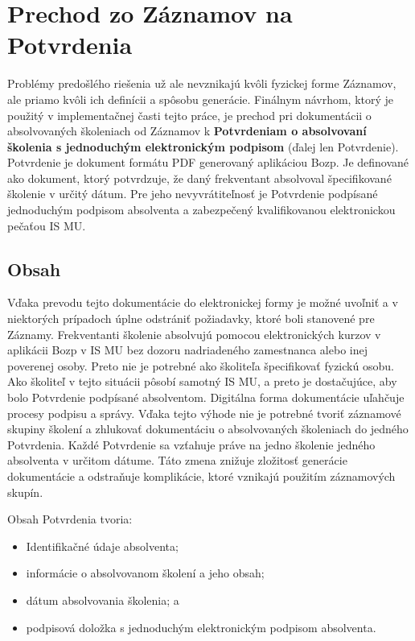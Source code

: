 \documentclass[
  digital,     %
  oneside,     %
  nosansbold,  %
  nocolorbold, %
  lof,         %
  nolot,         %
]{fithesis4}
\begin{document}
\section{Prechod zo Záznamov na Potvrdenia}
Problémy predošlého riešenia už ale nevznikajú kvôli fyzickej forme Záznamov, ale priamo kvôli ich definícii a spôsobu generácie. Finálnym návrhom, ktorý je použitý v implementačnej časti tejto práce, je prechod pri dokumentácii o absolvovaných školeniach od Záznamov k \textbf{Potvrdeniam o absolvovaní školenia s jednoduchým elektronickým podpisom} (ďalej len Potvrdenie). Potvrdenie je dokument formátu PDF generovaný aplikáciou Bozp. Je definované ako dokument, ktorý potvrdzuje, že daný frekventant absolvoval špecifikované školenie v určitý dátum. Pre jeho nevyvrátiteľnosť je Potvrdenie podpísané jednoduchým podpisom absolventa a zabezpečený kvalifikovanou elektronickou pečaťou IS MU.

\subsection*{Obsah}
Vďaka prevodu tejto dokumentácie do elektronickej formy je možné uvoľniť a v niektorých prípadoch úplne odstrániť požiadavky, ktoré boli stanovené pre Záznamy. 
Frekventanti školenie absolvujú pomocou elektronických kurzov v aplikácii Bozp v IS MU bez dozoru nadriadeného zamestnanca alebo inej poverenej osoby. Preto nie je potrebné ako školiteľa špecifikovať fyzickú osobu. Ako školiteľ v tejto situácii pôsobí samotný IS MU, a preto je dostačujúce, aby bolo Potvrdenie podpísané absolventom.
Digitálna forma dokumentácie uľahčuje procesy podpisu a správy. Vďaka tejto výhode nie je potrebné tvoriť záznamové skupiny školení a zhlukovať dokumentáciu o absolvovaných školeniach do jedného Potvrdenia. Každé Potvrdenie sa vzťahuje práve na jedno školenie jedného absolventa v určitom dátume. Táto zmena znižuje zložitosť generácie dokumentácie a odstraňuje komplikácie, ktoré vznikajú použitím záznamových skupín.

Obsah Potvrdenia tvoria:

\begin{itemize}
  \item Identifikačné údaje absolventa;
  \item informácie o absolvovanom školení a jeho obsah;
  \item dátum absolvovania školenia; a
  \item podpisová doložka s jednoduchým elektronickým podpisom absolventa.
\end{itemize}
\end{document}
